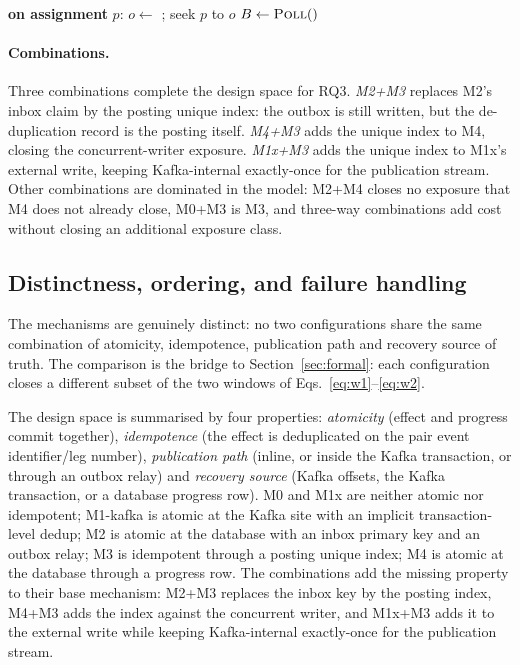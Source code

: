 \begin{algorithm}[t]
\footnotesize
\begin{algorithmic}[1]
\State \textbf{on assignment} $p$: $o \gets$ ; seek $p$ to $o$
\Loop
  \State $B \gets \Call{Poll}{ }$
  \State {}
    \State {}
  \EndFor
    \State {} 
  \EndFor
  \State {} 
  \State {}
\EndLoop
\end{algorithmic}
\caption{M4: offsets stored in the posting transaction}
\label{alg:m4}
\end{algorithm}

\paragraph{Combinations.}
Three combinations complete the design space for RQ3. \emph{M2+M3} replaces M2's inbox claim
by the posting unique index: the outbox is still written, but the de-duplication record is the
posting itself. \emph{M4+M3} adds the unique index to M4, closing the concurrent-writer
exposure. \emph{M1x+M3} adds the unique index to M1x's external write, keeping Kafka-internal
exactly-once for the publication stream. Other combinations are dominated in the model: M2+M4
closes no exposure that M4 does not already close, M0+M3 is M3, and three-way combinations add
cost without closing an additional exposure class.

\subsection{Distinctness, ordering, and failure handling}
\label{sec:mechanisms:compare}

The mechanisms are genuinely distinct: no two configurations share the same combination of
atomicity, idempotence, publication path and recovery source of truth. The comparison is the
bridge to Section~\ref{sec:formal}: each configuration closes a different subset of the two
windows of Eqs.~\eqref{eq:w1}--\eqref{eq:w2}.




The design space is summarised by four properties: \emph{atomicity} (effect and progress commit
together), \emph{idempotence} (the effect is deduplicated on the pair event identifier/leg
number), \emph{publication path} (inline, or inside the Kafka transaction, or through an outbox
relay) and \emph{recovery source} (Kafka offsets, the Kafka transaction, or a database progress
row). M0 and M1x are neither atomic nor idempotent; M1-kafka is atomic at the Kafka site with an
implicit transaction-level dedup; M2 is atomic at the database with an inbox primary key and an
outbox relay; M3 is idempotent through a posting unique index; M4 is atomic at the database
through a progress row. The combinations add the missing property to their base mechanism:
M2+M3 replaces the inbox key by the posting index, M4+M3 adds the index against the concurrent
writer, and M1x+M3 adds it to the external write while keeping Kafka-internal exactly-once for
the publication stream.

